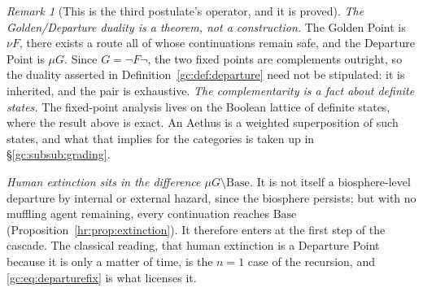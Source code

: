 \documentclass[11pt]{article}
\numberwithin{equation}{section}
\theoremstyle{plain}
\theoremstyle{definition}
\theoremstyle{remark}
\newtheorem{remark}[theorem]{Remark}
\begin{document}
\begin{remark}[This is the third postulate's operator, and it is proved]
\emph{The Golden/Departure duality is a theorem, not a construction.}
The Golden Point is $\nu F$, there exists a route all of whose
continuations remain safe, and the Departure Point is $\mu G$. Since
$G=\neg F\neg$, the two fixed points are complements outright, so the
duality asserted in Definition~\ref{gc:def:departure} need not be
stipulated: it is inherited, and the pair is exhaustive. \emph{The complementarity is a fact about definite states.} The
fixed-point analysis lives on the Boolean lattice of definite states,
where the result above is exact. An Aethus is a weighted superposition
of such states, and what that implies for the categories is taken up in
\S\ref{gc:subsub:grading}.

\emph{Human extinction sits in the difference
$\mu G\setminus\mathrm{Base}$.} It is not itself a biosphere-level
departure by internal or external hazard,
since the biosphere persists; but with no muffling agent remaining,
every continuation reaches $\mathrm{Base}$
(Proposition~\ref{hr:prop:extinction}). It therefore enters at the
first step of the cascade. The classical reading, that human
extinction is a Departure Point because it is only a matter of time, is the $n=1$ case of the recursion, and \eqref{gc:eq:departurefix} is
what licenses it.
\end{remark}
\end{document}

